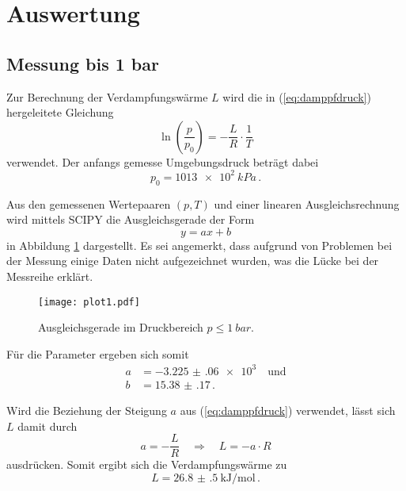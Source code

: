 \section{Auswertung}
\label{sec:Auswertung}

\subsection{Messung bis 1 bar}

Zur Berechnung der Verdampfungswärme $L$ wird die in (\ref{eq:damppfdruck}) hergeleitete Gleichung 
\begin{equation}
    \ln \left(\frac{p}{p_{0}}\right) = -\frac{L}{R} \cdot \frac{1}{T}
\end{equation}
verwendet. Der anfangs gemesse Umgebungsdruck beträgt dabei
\begin{equation}
    p_{0} = \qty{1013e2}{kPa} \, .
\end{equation}

Aus den gemessenen Wertepaaren $(p,T)$ und einer linearen Ausgleichsrechnung
wird mittels SCIPY \cite{scipy} die Ausgleichsgerade der Form
\begin{equation}
    y = ax + b 
\end{equation}
in Abbildung \ref{fig:plot1} dargestellt.
Es sei angemerkt, dass aufgrund von Problemen bei der Messung einige Daten nicht aufgezeichnet wurden,
was die Lücke bei der Messreihe erklärt.
\begin{figure}[H]
    \centering
    \texttt{[image: plot1.pdf]}
    \caption{Ausgleichsgerade im Druckbereich $p \leq \qty{1}{bar}$.}
    \label{fig:plot1}
\end{figure}

Für die Parameter ergeben sich somit
\begin{align*}
    a &= \num{-3.225(060)e3} \quad \text{und} \\
    b &= \num{15.38(17)} \, .
\end{align*}

Wird die Beziehung der Steigung $a$ aus (\ref{eq:damppfdruck}) verwendet, lässt sich $L$ damit durch
\begin{equation}
    a = -\frac{L}{R} \quad \Rightarrow \quad L=-a \cdot R
\end{equation}
ausdrücken. 
Somit ergibt sich die Verdampfungswärme zu
\begin{equation}
    L = \qty{26.8(5)}{\kilo\joule\per\mol} \, .
\end{equation}

